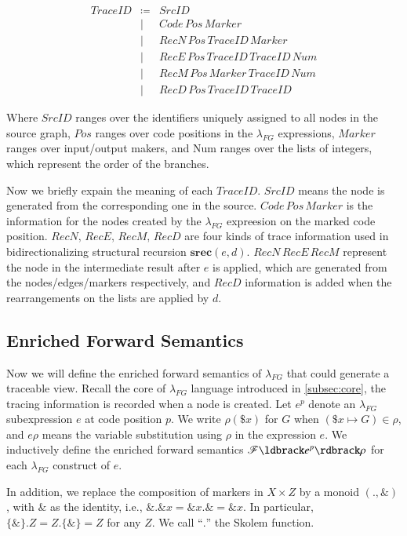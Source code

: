 \documentclass{llncs}
\begin{document}
$$\begin{array}{lll}
TraceID &\coloneqq	&SrcID\\
	&\mid		&Code\,Pos\,Marker\\
	&\mid		&RecN\,Pos\,TraceID\,Marker\\
	&\mid		&RecE\,Pos\,TraceID\,TraceID\,Num\\
	&\mid		&RecM\,Pos\,Marker\,TraceID\,Num\\
	&\mid		&RecD\,Pos\,TraceID\,TraceID
\end{array}$$

Where $SrcID$ ranges over the identifiers uniquely assigned to all nodes in the source graph, $Pos$ ranges over code positions in the $\lambda_{FG}$ expressions, $Marker$ ranges over input/output makers, and Num ranges over the lists of integers, which represent the order of the branches. 

Now we briefly expain the meaning of each $TraceID$. $SrcID$ means the node is generated from the corresponding one in the source. $Code\,Pos\,Marker$ is the information for the nodes created by the $\lambda_{FG}$ expreesion on the marked code position. $RecN,\,RecE,\,RecM,\,RecD$ are four kinds of trace information used in bidirectionalizing structural recursion $\mathbf{srec}(e,d)$. $RecN\,RecE\,RecM$ represent the node in the intermediate result after $e$ is applied, which are generated from the nodes/edges/markers respectively, and $RecD$ information is added when the rearrangements on the lists are applied by $d$. 

\subsection{Enriched Forward Semantics}\label{subsec:fwd-sem}

Now we will define the enriched forward semantics of $\lambda_{FG}$ that could generate a traceable view. Recall the core of $\lambda_{FG}$ language introduced in \ref{subsec:core}, the tracing information is recorded when a node is created. Let $e^p$ denote an $\lambda_{FG}$ subexpression $e$ at code position $p$. We write $\rho(\$x)$ for $G$ when $(\$x\mapsto G)\in\rho$, and $e\rho$ means the variable substitution using $\rho$ in the expression $e$. We inductively define the enriched forward semantics $\mathscr{F}\ldbrack e^p\rdbrack\rho$ for each $\lambda_{FG}$ construct of $e$.

In addition, we replace the composition of markers in $X\times Z$ by a monoid $(.,\&)$, with $\&$ as the identity, i.e., $\&.\&x=\&x.\&=\&x$. In particular, $\{\&\}.Z=Z.\{\&\}=Z$ for any $Z$. We call ``$.$'' the Skolem function.
 
\end{document}
